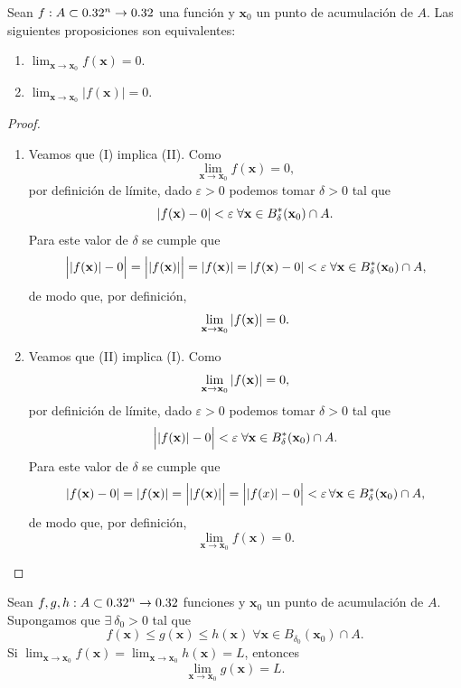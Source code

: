  \begin{propertie} \label{prop:lim_1}
    Sean $f:A \subset 0.32^n \to 0.32$ una funci\'on y $\mathbf{x}_0$ un punto de acumulaci\'on de $A$. Las siguientes proposiciones son equivalentes:
 \begin{enumerate} 
  \item $\lim_{\mathbf{x} \to \mathbf{x}_0} f(\mathbf{x}) = 0$.
  \item $\lim_{\mathbf{x} \to \mathbf{x}_0} | f(\mathbf{x}) | = 0$.
 \end{enumerate}
 \begin{proof}
 \mbox{}
 
 \begin{enumerate} %
  \item Veamos que (I) implica (II). Como 
  \[
   \lim_{\mathbf{x} \to \mathbf{x}_0} f(\mathbf{x}) = 0,
  \]
  por definici\'on de l\'imite, dado $\varepsilon > 0$ podemos tomar $\delta > 0$ tal que 
  \[
   \abs{f(\mathbf{x}) - 0} < \varepsilon \; \forall \mathbf{x} \in B^*_{\delta}(\mathbf{x}_0) \cap A.
  \]
  Para este valor de $\delta$ se cumple que
  \[
   \Big| \abs{f(\mathbf{x})} - 0 \Big| = \Big| \abs{f(\mathbf{x})} \Big| = \abs{f(\mathbf{x})} = \abs{f(\mathbf{x}) - 0} < \varepsilon \; 
   \forall \mathbf{x} \in B^*_{\delta}(\mathbf{x}_0) \cap A,
  \]
  de modo que, por definici\'on, 
  \[
   \lim_{\mathbf{x} \to \mathbf{x}_0} \abs{ f(\mathbf{x}) } = 0.
  \]
  \item Veamos que (II) implica (I). Como
  \[
   \lim_{\mathbf{x} \to \mathbf{x}_0} \abs{ f(\mathbf{x}) } = 0,
  \]
  por definici\'on de l\'imite, dado $\varepsilon > 0$ podemos tomar $\delta > 0$ tal que 
  \[
   \Big| \abs{f(\mathbf{x})} - 0 \Big| < \varepsilon \; \forall \mathbf{x} \in B^*_{\delta}(\mathbf{x}_0) \cap A.
  \]
  Para este valor de $\delta$ se cumple que
  \[
   \abs{f(\mathbf{x}) - 0} = \abs{f(\mathbf{x})} = \Big| \abs{f(\mathbf{x})} \Big| = \Big| \abs{f(x)} - 0 \Big| < \varepsilon \, 
   \forall \mathbf{x} \in B^*_{\delta}(\mathbf{x}_0) \cap A,
  \]
  de modo que, por definici\'on, 
  \[
   \lim_{\mathbf{x} \to \mathbf{x}_0} f(\mathbf{x}) = 0.
  \]
 \end{enumerate}
 \end{proof}

\end{propertie} 

\begin{propertie} \label{prop:sandwich} %
Sean $f, g, h : A \subset 0.32^n \to 0.32$ funciones y $\mathbf{x}_0$ un punto de acumulaci\'on de $A$. Supongamos que $\exists\: \delta_0 > 0$ tal que 
\[
 f(\mathbf{x}) \le g(\mathbf{x}) \le h(\mathbf{x}) \; \forall \mathbf{x} \in B_{\delta_0}(\mathbf{x}_0) \cap A.
\]
Si $\lim_{\mathbf{x} \to \mathbf{x}_0}f(\mathbf{x}) = \lim_{\mathbf{x} \to \mathbf{x}_0}h(\mathbf{x}) = L$, entonces
\[
 \lim_{\mathbf{x} \to \mathbf{x}_0}g(\mathbf{x}) = L.
\]
 
\end{propertie}

